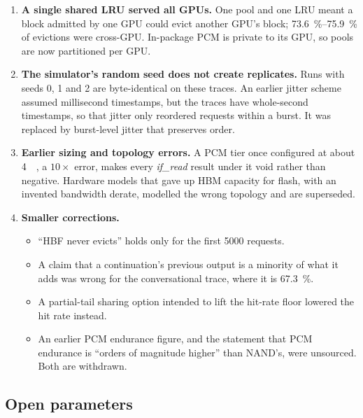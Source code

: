 \documentclass[conference]{IEEEtran}
\begin{document}
\begin{enumerate}
        too high, because only \SI{12}{\tebi\byte} receives the counted bytes.
  \item \textbf{A single shared LRU served all GPUs.} One pool and one LRU
        meant a block admitted by one GPU could evict another GPU's block;
        \SIrange{73.6}{75.9}{\percent} of evictions were cross-GPU. In-package
        PCM is private to its GPU, so pools are now partitioned per GPU.
  \item \textbf{The simulator's random seed does not create replicates.} Runs
        with seeds 0, 1 and 2 are byte-identical on these traces. An earlier
        jitter scheme assumed millisecond timestamps, but the traces have
        whole-second timestamps, so that jitter only reordered requests within
        a burst. It was replaced by burst-level jitter that preserves order.
  \item \textbf{Earlier sizing and topology errors.} A PCM tier once configured
        at about \SI{4}{\gibi\byte}, a $10\times$ error, makes every
        \emph{if\_read} result under it void rather than negative. Hardware
        models that gave up HBM capacity for flash, with an invented bandwidth
        derate, modelled the wrong topology and are superseded.
  \item \textbf{Smaller corrections.}
        \begin{itemize}
          \item ``HBF never evicts'' holds only for the first \num{5000}
                requests.
          \item A claim that a continuation's previous output is a minority of
                what it adds was wrong for the conversational trace, where it
                is \SI{67.3}{\percent}.
          \item A partial-tail sharing option intended to lift the hit-rate
                floor lowered the hit rate instead.
          \item An earlier PCM endurance figure, and the statement that PCM
                endurance is ``orders of magnitude higher'' than NAND's, were
                unsourced. Both are withdrawn.
        \end{itemize}
\end{enumerate}

\subsection{Open parameters}
\end{document}
